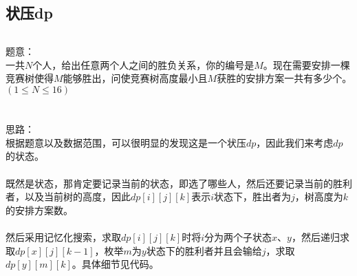 \documentclass[twoside]{article}
\begin{document}
\subsection{状压dp}
\begin{lstlisting}
\end{lstlisting}
题意：\\
一共$N$个人，给出任意两个人之间的胜负关系，你的编号是$M$。现在需要安排一棵竞赛树使得$M$能够胜出，问使竞赛树高度最小且$M$获胜的安排方案一共有多少个。$(1\leq N\leq 16)$\\
\\
\\
思路：\\
根据题意以及数据范围，可以很明显的发现这是一个状压$dp$，因此我们来考虑$dp$的状态。\\
\\
既然是状态，那肯定要记录当前的状态，即选了哪些人，然后还要记录当前的胜利者，以及当前树的高度，因此$dp[i][j][k]$表示$i$状态下，胜出者为$j$，树高度为$k$的安排方案数。\\
\\
然后采用记忆化搜索，求取$dp[i][j][k]$时将$i$分为两个子状态$x$、$y$，然后递归求取$dp[x][j][k-1]$，枚举$m$为$y$状态下的胜利者并且会输给$j$，求取$dp[y][m][k]$。具体细节见代码。\\
\end{document}
